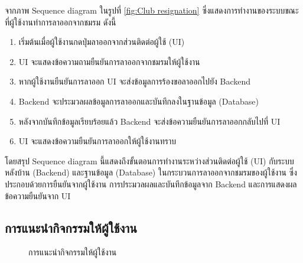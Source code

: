 \documentclass[14pt,oneside,openright,a4paper]{cpe-thai-project}
\begin{document}
  จากภาพ Sequence diagram ในรูปที่ \ref{fig:Club resignation} ซึ่งแสดงการทำงานของระบบขณะที่ผู้ใช้งานทำการลาออกจากชมรม ดังนี้
  \begin{enumerate}
    \item เริ่มต้นเมื่อผู้ใช้งานกดปุ่มลาออกจากส่วนติดต่อผู้ใช้ (UI)
    \item UI จะแสดงข้อความถามยืนยันการลาออกจากชมรมให้ผู้ใช้งาน
    \item หากผู้ใช้งานยืนยันการลาออก UI จะส่งข้อมูลการร้องขอลาออกไปยัง Backend
    \item Backend จะประมวลผลข้อมูลการลาออกและบันทึกลงในฐานข้อมูล (Database)
    \item หลังจากบันทึกข้อมูลเรียบร้อยแล้ว Backend จะส่งข้อความยืนยันการลาออกกลับไปที่ UI
    \item UI จะแสดงข้อความยืนยันการลาออกให้ผู้ใช้งานทราบ
  \end{enumerate}
  โดยสรุป Sequence diagram นี้แสดงถึงขั้นตอนการทำงานระหว่างส่วนติดต่อผู้ใช้ (UI) กับระบบหลังบ้าน (Backend) และฐานข้อมูล (Database) ในกระบวนการลาออกจากชมรมของผู้ใช้งาน ซึ่งประกอบด้วยการยืนยันจากผู้ใช้งาน การประมวลผลและบันทึกข้อมูลจาก Backend และการแสดงผลข้อความยืนยันจาก UI

  \newpage

\subsection{การแนะนำกิจกรรมให้ผู้ใช้งาน}

  \begin{figure}[!h]\centering
    \setlength{\fboxrule}{0.5mm} %
    \setlength{\fboxsep}{0.5cm}
    \caption{การแนะนำกิจกรรมให้ผู้ใช้งาน}\label{fig:Feed recommendation}
  \end{figure}
\end{document}
